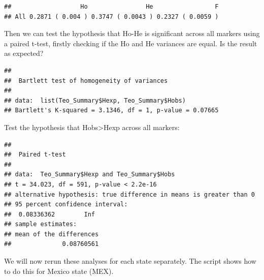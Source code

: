 \documentclass[
]{book}
\newenvironment{Shaded}{\begin{snugshade}}{\end{snugshade}}
\newcommand{\AttributeTok}[1]{\textcolor[rgb]{0.77,0.63,0.00}{#1}}
\newcommand{\ConstantTok}[1]{\textcolor[rgb]{0.00,0.00,0.00}{#1}}
\newcommand{\FunctionTok}[1]{\textcolor[rgb]{0.00,0.00,0.00}{#1}}
\newcommand{\NormalTok}[1]{#1}
\newcommand{\SpecialCharTok}[1]{\textcolor[rgb]{0.00,0.00,0.00}{#1}}
\newcommand{\StringTok}[1]{\textcolor[rgb]{0.31,0.60,0.02}{#1}}
\begin{document}
\begin{verbatim}
##                   Ho                He                 F
## All 0.2871 ( 0.004 ) 0.3747 ( 0.0043 ) 0.2327 ( 0.0059 )
\end{verbatim}

Then we can test the hypothesis that Ho-He is significant across all markers using a paired t-test, firstly checking if the Ho and He variances are equal. Is the result as expected?

\begin{Shaded}
\end{Shaded}

\begin{verbatim}
## 
##  Bartlett test of homogeneity of variances
## 
## data:  list(Teo_Summary$Hexp, Teo_Summary$Hobs)
## Bartlett's K-squared = 3.1346, df = 1, p-value = 0.07665
\end{verbatim}

Test the hypothesis that Hobs\textgreater Hexp across all markers:

\begin{Shaded}
\end{Shaded}

\begin{verbatim}
## 
##  Paired t-test
## 
## data:  Teo_Summary$Hexp and Teo_Summary$Hobs
## t = 34.023, df = 591, p-value < 2.2e-16
## alternative hypothesis: true difference in means is greater than 0
## 95 percent confidence interval:
##  0.08336362        Inf
## sample estimates:
## mean of the differences 
##              0.08760561
\end{verbatim}

We will now rerun these analyses for each state separately. The script shows how to do this for Mexico state (MEX).
\end{document}
